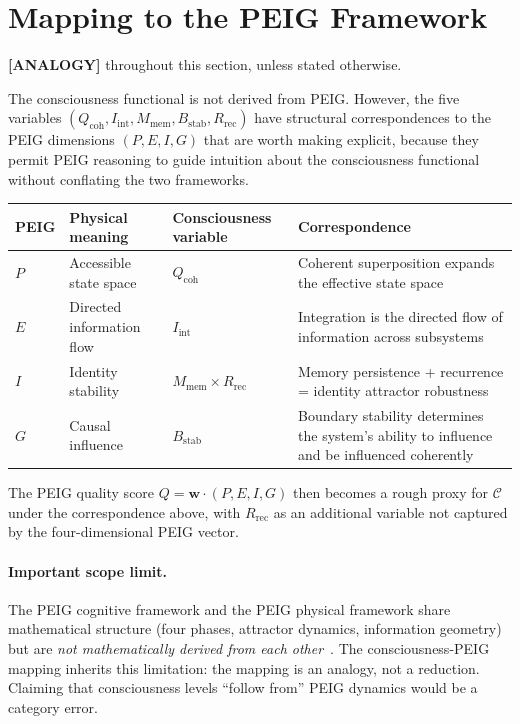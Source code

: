 \documentclass[12pt,letterpaper]{article}
\newcommand{\ANALOGY}[1]{\textcolor{orange!70!black}{\textbf{[ANALOGY]}} #1}
\newcommand{\Cfunc}{\mathcal{C}}
\newcommand{\Qcoh}{Q_{\mathrm{coh}}}
\newcommand{\Iint}{I_{\mathrm{int}}}
\newcommand{\Mmem}{M_{\mathrm{mem}}}
\newcommand{\Bstab}{B_{\mathrm{stab}}}
\newcommand{\Rrec}{R_{\mathrm{rec}}}
\begin{document}
\section{Mapping to the PEIG Framework}
\label{sec:peig}

\ANALOGY{} throughout this section, unless stated otherwise.

The consciousness functional is not derived from PEIG. However, the five
variables $(\Qcoh, \Iint, \Mmem, \Bstab, \Rrec)$ have structural
correspondences to the PEIG dimensions $(P, E, I, G)$ that are worth
making explicit, because they permit PEIG reasoning to guide intuition
about the consciousness functional without conflating the two frameworks.

\begin{center}
\begin{tabular}{p{1.5cm} p{3cm} p{4cm} p{3.5cm}}
\toprule
\textbf{PEIG} & \textbf{Physical meaning} & \textbf{Consciousness variable} & \textbf{Correspondence} \\
\midrule
$P$ & Accessible state space & $\Qcoh$ &
  Coherent superposition expands the effective state space \\
$E$ & Directed information flow & $\Iint$ &
  Integration is the directed flow of information across subsystems \\
$I$ & Identity stability & $\Mmem \times \Rrec$ &
  Memory persistence + recurrence = identity attractor robustness \\
$G$ & Causal influence & $\Bstab$ &
  Boundary stability determines the system's ability to influence and be influenced coherently \\
\bottomrule
\end{tabular}
\end{center}

The PEIG quality score $Q = \mathbf{w} \cdot (P, E, I, G)$ then becomes
a rough proxy for $\Cfunc$ under the correspondence above, with
$\Rrec$ as an additional variable not captured by the four-dimensional PEIG vector.

\paragraph{Important scope limit.} The PEIG cognitive framework and the
PEIG physical framework share mathematical structure (four phases, attractor
dynamics, information geometry) but are \emph{not mathematically derived
from each other}~\cite{Monette2026a}. The consciousness-PEIG mapping
inherits this limitation: the mapping is an analogy, not a reduction.
Claiming that consciousness levels ``follow from'' PEIG dynamics would
be a category error.
\end{document}
